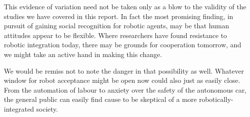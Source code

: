 \documentclass{sfuthesis}
\begin{document}
This evidence of variation need not be taken only as a blow to the validity of the studies we have covered in this report. In fact the most promising finding, in pursuit of gaining social recognition for robotic agents, may be that human attitudes appear to be flexible. Where researchers have found resistance to robotic integration today, there may be grounds for cooperation tomorrow, and we might take an active hand in making this change. 

We would be remiss not to note the danger in that possibility as well. Whatever window for robot acceptance might be open now could also just as easily close. From the automation of labour to anxiety over the safety of the autonomous car, the general public can easily find cause to be skeptical of a more robotically-integrated society. 















\end{document}
